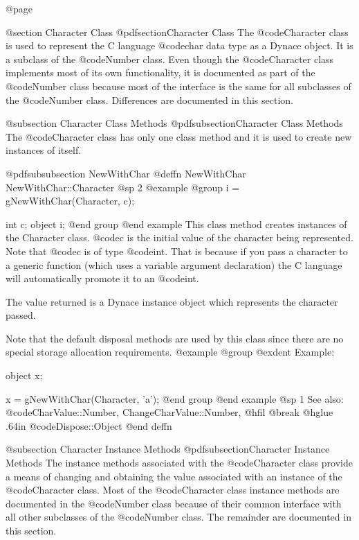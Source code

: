 @page

@section Character Class
@pdfsection{Character Class}
The @code{Character} class is used to represent the C language
@code{char} data type as a Dynace object.  It is a subclass of the
@code{Number} class.  Even though the @code{Character} class
implements most of its own functionality, it is documented as part of
the @code{Number} class because most of the interface is the same for
all subclasses of the @code{Number} class.  Differences are documented
in this section.


@subsection Character Class Methods
@pdfsubsection{Character Class Methods}
The @code{Character} class has only one class method and it is used to create
new instances of itself.



@pdfsubsubsection {NewWithChar}
@deffn {NewWithChar} NewWithChar::Character
@sp 2
@example
@group
i = gNewWithChar(Character, c);

int     c;
object  i;
@end group
@end example
This class method creates instances of the Character class.  @code{c} is
the initial value of the character being represented.  Note that
@code{c} is of type @code{int}.  That is because if you pass a character
to a generic function (which uses a variable argument declaration) the C
language will automatically promote it to an @code{int}.

The value returned is a Dynace instance object which represents the character
passed.

Note that the default disposal methods are used by this class since
there are no special storage allocation requirements.
@example
@group
@exdent Example:

object  x;

x = gNewWithChar(Character, 'a');
@end group
@end example
@sp 1
See also:  @code{CharValue::Number, ChangeCharValue::Number,}
@hfil @break @hglue .64in      @code{Dispose::Object}
@end deffn





@subsection Character Instance Methods
@pdfsubsection{Character Instance Methods}
The instance methods associated with the @code{Character} class provide
a means of changing and obtaining the value associated with an instance
of the @code{Character} class.  Most of the @code{Character} class
instance methods are documented in the @code{Number} class because of
their common interface with all other subclasses of the @code{Number}
class.  The remainder are documented in this section.






